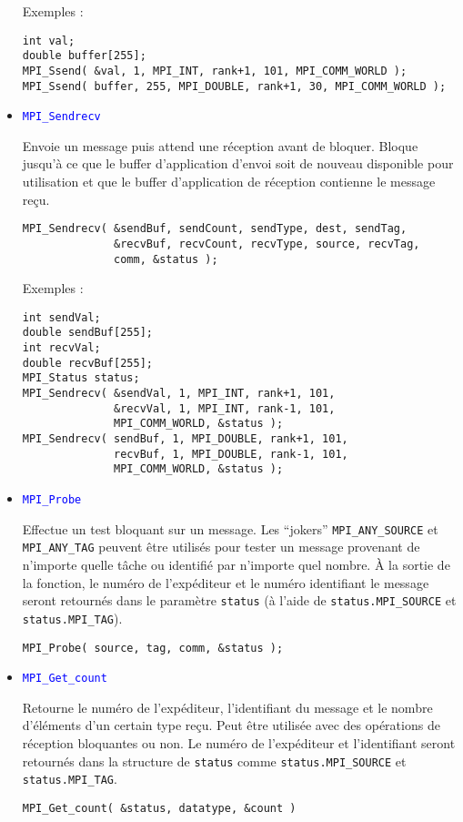 \documentclass[11pt,a4paper]{article}
\begin{document}
\begin{itemize}
Exemples :
\begin{lstlisting}[style=customcpp]
int val;
double buffer[255];
MPI_Ssend( &val, 1, MPI_INT, rank+1, 101, MPI_COMM_WORLD );
MPI_Ssend( buffer, 255, MPI_DOUBLE, rank+1, 30, MPI_COMM_WORLD );
\end{lstlisting}

\item \textcolor{blue}{\texttt{MPI\_Sendrecv}}

Envoie un message puis attend une réception avant de bloquer. Bloque jusqu'à ce que le buffer d'application
d'envoi soit de nouveau disponible pour utilisation et que le buffer d'application de réception contienne
le message reçu.

\begin{lstlisting}[style=customcpp]
MPI_Sendrecv( &sendBuf, sendCount, sendType, dest, sendTag, 
              &recvBuf, recvCount, recvType, source, recvTag,
              comm, &status );
\end{lstlisting}

Exemples :
\begin{lstlisting}[style=customcpp]
int sendVal;
double sendBuf[255];
int recvVal;
double recvBuf[255];
MPI_Status status;
MPI_Sendrecv( &sendVal, 1, MPI_INT, rank+1, 101,
              &recvVal, 1, MPI_INT, rank-1, 101,
              MPI_COMM_WORLD, &status );
MPI_Sendrecv( sendBuf, 1, MPI_DOUBLE, rank+1, 101,
              recvBuf, 1, MPI_DOUBLE, rank-1, 101,
              MPI_COMM_WORLD, &status ); 
\end{lstlisting}

\item \textcolor{blue}{\texttt{MPI\_Probe}}

Effectue un test bloquant sur un message. Les ``jokers'' \texttt{MPI\_ANY\_SOURCE} et \texttt{MPI\_ANY\_TAG} peuvent être utilisés
pour tester un message provenant de n'importe quelle tâche ou identifié par n'importe quel nombre. \`A la sortie de la fonction,
le numéro de l'expéditeur et le numéro identifiant le message seront retournés dans le paramètre \texttt{status} (à l'aide
de \texttt{status.MPI\_SOURCE} et \texttt{status.MPI\_TAG}).

\begin{lstlisting}[style=customcpp]
MPI_Probe( source, tag, comm, &status );
\end{lstlisting}

\item \textcolor{blue}{\texttt{MPI\_Get\_count}}

Retourne le numéro de l'expéditeur, l'identifiant du message et le nombre d'éléments d'un certain type reçu. Peut être utilisée avec des opérations
de réception bloquantes ou non. Le numéro de l'expéditeur et l'identifiant seront retournés dans la structure de \texttt{status} comme 
\texttt{status.MPI\_SOURCE} et \texttt{status.MPI\_TAG}. 

\begin{lstlisting}[style=customcpp]
MPI_Get_count( &status, datatype, &count )
\end{lstlisting}

\end{itemize}
\end{document}
